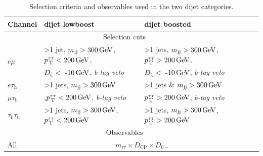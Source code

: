 \begin{table}[!]
    \centering
    \caption[Dijet event categorization.]{Selection criteria and observables used in the two dijet categories.}\label{ES:categorization_2jet}
    \begin{tabular}{lllll}
        \toprule
        Channel         & dijet lowboost       & dijet boosted \\ \hline
        \multicolumn{3}{c}{Selection cuts}                       \\ \hline
        \multirow{2}{*}{$e\mu$}          & {\footnotesize >1 jet, $m_\text{jj}>\text{300\,{GeV}}$, $p_\text{\,T}^{\tau\tau}<\text{200\,{GeV}}$, }   &     {\footnotesize >1 jets, $m_\text{jj}>\text{300\,{GeV}}$, $p_\text{\,T}^{\tau\tau}>\text{200\,{GeV}}$, }           \\         
                                         & {\footnotesize $D_\zeta< \text{ -10\,{GeV}}$, \textit{b-tag veto} }                     &   {\footnotesize $D_\zeta< \text{ -10\,{GeV}}$, \textit{b-tag veto}  }  \\
        \multirow{2}{*}{$e\tau_\text{h}$}       & \multirow{2}{*}{{\footnotesize>1 jets, $ m_\text{jj}>\text{300\,{GeV}}$}}             &        \multirow{2}{*}{{\footnotesize >1 jets \& $ m_\text{jj}>\text{300\,{GeV}}$}  }      \\                
                                         &                                                                  &                                                               \\
        $\mu\tau_\text{h}$                      & {\footnotesize ,$p_\text{\,T}^{\tau\tau}<\text{200\,{GeV}}$, \textit{b-tag veto} }                       &          {\footnotesize$p_\text{\,T}^{\tau\tau}>\text{200\,{GeV}}$, \textit{b-tag veto}}      \\                
        $\tau_\text{h}\tau_\text{h}$  & {\footnotesize >1 jets, $m_\text{jj}>\text{300\,{GeV}}$, $p_\text{\,T}^{\tau\tau}<\text{200\,{GeV}}$ }                                            &      {\footnotesize >1 jets, $ m_\text{jj}>\text{300\,{GeV}}$, $p_\text{\,T}^{\tau\tau}>\text{200\,{GeV}}$  }          \\  \midrule 
        \multicolumn{3}{c}{Observables}                       \\ \hline
         All           &  \multicolumn{2}{c}{$m_{\tau\tau} \times D_\text{CP} \times D_{0-}$}  \\ \bottomrule                
    \end{tabular}%
\end{table}%

